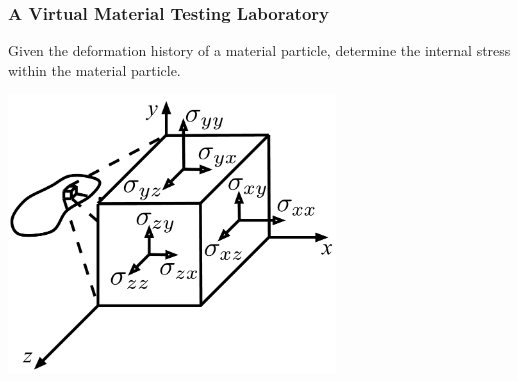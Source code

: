 \documentclass[usenames,dvipsnames]{beamer}
\begin{document}
  
\begin{frame}
  
  \frametitle{A Virtual Material Testing Laboratory}
  
  Given the deformation history of a material particle, determine the internal
  stress within the material particle.
  
  \begin{center}
  {
  \includegraphics[width=0.65\textwidth]{StressTensor.pdf}
  }
  \end{center}
  
  \end{frame}
  
  
\end{document}
